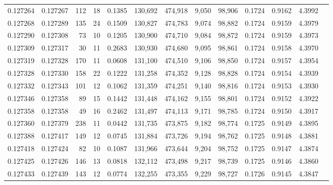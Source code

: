 \begin{tabular}{rrrrrrrrrrrrr}
0.127264 & 0.127267 &   112 &  18 &                                     0.1385 & 130,692 & 474,918 &   9,050 &  98,906 & 0.1724 & 0.9162 & 4.3992 \\
0.127268 & 0.127289 &   135 &  24 &                                     0.1509 & 130,827 & 474,783 &   9,074 &  98,882 & 0.1724 & 0.9159 & 4.3979 \\
0.127290 & 0.127308 &    73 &  10 &                                     0.1205 & 130,900 & 474,710 &   9,084 &  98,872 & 0.1724 & 0.9159 & 4.3973 \\
0.127309 & 0.127317 &    30 &  11 &                                     0.2683 & 130,930 & 474,680 &   9,095 &  98,861 & 0.1724 & 0.9158 & 4.3970 \\
0.127319 & 0.127328 &   170 &  11 &                                     0.0608 & 131,100 & 474,510 &   9,106 &  98,850 & 0.1724 & 0.9157 & 4.3954 \\
0.127328 & 0.127330 &   158 &  22 &                                     0.1222 & 131,258 & 474,352 &   9,128 &  98,828 & 0.1724 & 0.9154 & 4.3939 \\
0.127332 & 0.127343 &   101 &  12 &                                     0.1062 & 131,359 & 474,251 &   9,140 &  98,816 & 0.1724 & 0.9153 & 4.3930 \\
0.127346 & 0.127358 &    89 &  15 &                                     0.1442 & 131,448 & 474,162 &   9,155 &  98,801 & 0.1724 & 0.9152 & 4.3922 \\
0.127358 & 0.127358 &    49 &  16 &                                     0.2462 & 131,497 & 474,113 &   9,171 &  98,785 & 0.1724 & 0.9150 & 4.3917 \\
0.127360 & 0.127379 &   238 &  11 &                                     0.0442 & 131,735 & 473,875 &   9,182 &  98,774 & 0.1725 & 0.9149 & 4.3895 \\
0.127388 & 0.127417 &   149 &  12 &                                     0.0745 & 131,884 & 473,726 &   9,194 &  98,762 & 0.1725 & 0.9148 & 4.3881 \\
0.127418 & 0.127424 &    82 &  10 &                                     0.1087 & 131,966 & 473,644 &   9,204 &  98,752 & 0.1725 & 0.9147 & 4.3874 \\
0.127425 & 0.127426 &   146 &  13 &                                     0.0818 & 132,112 & 473,498 &   9,217 &  98,739 & 0.1725 & 0.9146 & 4.3860 \\
0.127433 & 0.127439 &   143 &  12 &                                     0.0774 & 132,255 & 473,355 &   9,229 &  98,727 & 0.1726 & 0.9145 & 4.3847 \\

\end{tabular}
